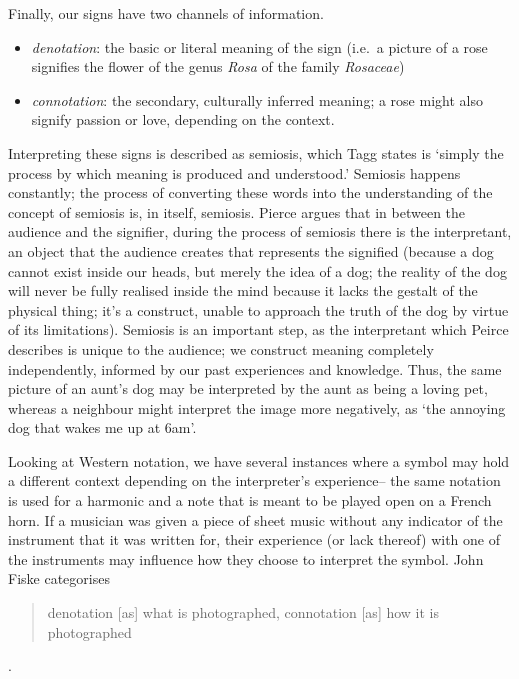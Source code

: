 Finally, our signs have two channels of information.
\begin{itemize}
\item \emph{\gls{denotation}}: the basic or literal meaning of the sign (i.e.\ a picture of a rose signifies the flower of the genus \emph{Rosa} of the family \emph{Rosaceae})
\item \emph{\gls{connotation}}: the secondary, culturally inferred meaning; a rose might also signify passion or love, depending on the context.
\end{itemize}

Interpreting these signs is described as semiosis, which Tagg states is `simply the process by which meaning is produced and understood.'\autocite[156]{taggMusicMeaningsModern2013}
Semiosis happens constantly; the process of converting these words into the understanding of the concept of semiosis is, in itself, semiosis. 
Pierce argues that in between the audience and the signifier, during the process of semiosis there is the interpretant, an object that the audience creates that represents the signified (because a dog cannot exist inside our heads, but merely the idea of a dog; the reality of the dog will never be fully realised inside the mind because it lacks the gestalt of the physical thing; 
it's a construct, unable to approach the truth of the dog by virtue of its limitations).
Semiosis is an important step, as the interpretant which Peirce describes is unique to the audience; we construct meaning completely independently, informed by our past experiences and knowledge.
Thus, the same picture of an aunt's dog may be interpreted by the aunt as being a loving pet, whereas a neighbour might interpret the image more negatively, as `the annoying dog that wakes me up at 6am'.

Looking at Western notation, we have several instances where a symbol may hold a different context depending on the interpreter's experience-- 
the same notation is used for a harmonic and a note that is meant to be played open on a French horn.\autocite[]{schuilingNotationCulturesEthnomusicology2019}
If a musician was given a piece of sheet music without any indicator of the instrument that it was written for, their experience (or lack thereof) with one of the instruments may influence how they choose to interpret the symbol.
John Fiske categorises \begin{quotation}
    denotation [as] what is photographed, connotation [as] how it is photographed
\end{quotation}.\autocite[91]{fiskeIntroductionCommunicationStudies2011}


